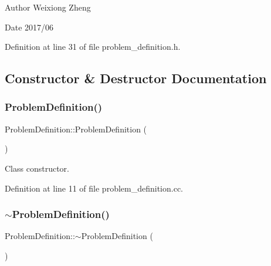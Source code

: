 \begin{DoxyAuthor}{Author}
Weixiong Zheng 
\end{DoxyAuthor}
\begin{DoxyDate}{Date}
2017/06 
\end{DoxyDate}


Definition at line 31 of file problem\+\_\+definition.\+h.



\subsection{Constructor \& Destructor Documentation}
\mbox{\label{class_problem_definition_ad5d05724dd7de8e362f0c8db129744f9}} 
\subsubsection{\texorpdfstring{Problem\+Definition()}{ProblemDefinition()}}
{\footnotesize\ttfamily Problem\+Definition\+::\+Problem\+Definition (\begin{DoxyParamCaption}{ }\end{DoxyParamCaption})}



Class constructor. 



Definition at line 11 of file problem\+\_\+definition.\+cc.

\mbox{\label{class_problem_definition_a6aa61be43188cf28040bd0e7d2bf02e3}} 
\subsubsection{\texorpdfstring{$\sim$\+Problem\+Definition()}{~ProblemDefinition()}}
{\footnotesize\ttfamily Problem\+Definition\+::$\sim$\+Problem\+Definition (\begin{DoxyParamCaption}{ }\end{DoxyParamCaption})}



